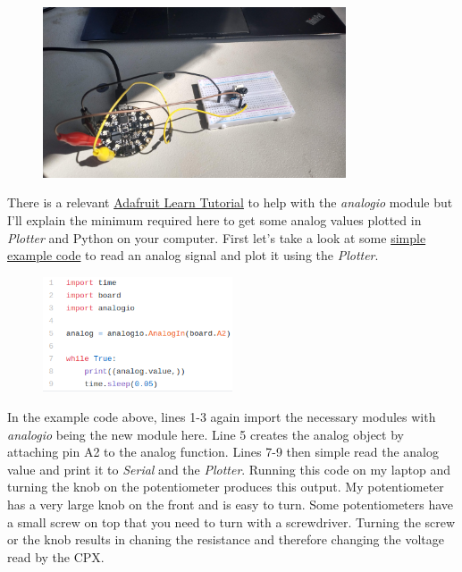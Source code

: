 \begin{figure}[H]
  \begin{center}
    \includegraphics[angle=180,width=0.8\textwidth]{Figures/Potentiometer_Alternate.jpg}
  \end{center}
\end{figure}
There is a relevant \href{https://learn.adafruit.com/adafruit-circuit-playground-express/circuitpython-analog-in}{Adafruit Learn Tutorial} to help with the {\it analogio} module but I’ll explain the minimum required here to get some analog values plotted in {\it Plotter} and Python on your computer. First let’s take a look at some \href{https://github.com/cmontalvo251/Microcontrollers/blob/master/Circuit_Playground/CircuitPython/Analog/analog_simple.py}{simple example code} to read an analog signal and plot it using the {\it Plotter}.
\begin{figure}[H]
  \begin{center}
    \includegraphics[width=0.5\textwidth]{Figures/analogio.png}
  \end{center}
\end{figure}
In the example code above, lines 1-3 again import the necessary modules with {\it analogio} being the new module here. Line 5 creates the analog object by attaching pin A2 to the analog function. Lines 7-9 then simple read the analog value and print it to {\it Serial} and the {\it Plotter}. Running this code on my laptop and turning the knob on the potentiometer produces this output. My potentiometer has a very large knob on the front and is easy to turn. Some potentiometers have a small screw on top that you need to turn with a screwdriver. Turning the screw or the knob results in chaning the resistance and therefore changing the voltage read by the CPX.
